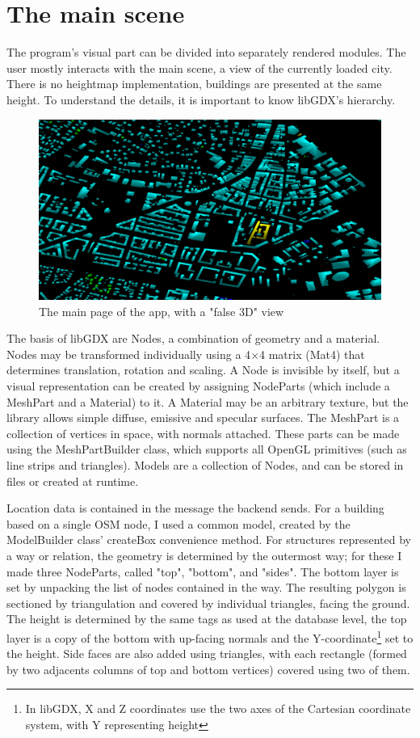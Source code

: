 \section{The main scene}
The program's visual part can be divided into separately rendered modules. The user mostly interacts with the main scene, a view of the currently loaded city. There is no heightmap implementation, buildings are presented at the same height. To understand the details, it is important to know libGDX's hierarchy.\cite{LibgdxModels}

\begin{figure}[!ht]
    \centering
    \includegraphics[width=150mm, keepaspectratio]{images/main_graphics_view.png}
    \caption{The main page of the app, with a "false 3D" view}
\end{figure}

The basis of libGDX are Nodes, a combination of geometry and a material. Nodes may be transformed individually using a 4$\times$4 matrix (Mat4) that determines translation, rotation and scaling. A Node is invisible by itself, but a visual representation can be created by assigning NodeParts (which include a MeshPart and a Material) to it. A Material may be an arbitrary texture, but the library allows simple diffuse, emissive and specular surfaces. The MeshPart is a collection of vertices in space, with normals attached. These parts can be made using the MeshPartBuilder class, which supports all OpenGL primitives (such as line strips and triangles). Models are a collection of Nodes, and can be stored in files or created at runtime.

Location data is contained in the message the backend sends. For a building based on a single OSM node, I used a common model, created by the ModelBuilder class' createBox convenience method. For structures represented by a way or relation, the geometry is determined by the outermost way; for these I made three NodeParts, called "top", "bottom", and "sides". The bottom layer is set by unpacking the list of nodes contained in the way. The resulting polygon is sectioned by triangulation and covered by individual triangles, facing the ground. The height is determined by the same tags as used at the database level, the top layer is a copy of the bottom with up-facing normals and the Y-coordinate\footnote{In libGDX, X and Z coordinates use the two axes of the Cartesian coordinate system, with Y representing height} set to the height. Side faces are also added using triangles, with each rectangle (formed by two adjacents columns of top and bottom vertices) covered using two of them.

